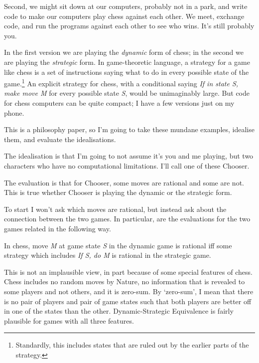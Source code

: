 \documentclass[
  11pt,
  letterpaper,
  DIV=11,
  numbers=noendperiod,
  twoside]{scrartcl}
\providecommand{\tightlist}{%
  \setlength{\itemsep}{0pt}\setlength{\parskip}{0pt}}
\begin{document}
Second, we might sit down at our computers, probably not in a park, and
write code to make our computers play chess against each other. We meet,
exchange code, and run the programs against each other to see who wins.
It's still probably you.

In the first version we are playing the \emph{dynamic} form of chess; in
the second we are playing the \emph{strategic} form. In game-theoretic
language, a strategy for a game like chess is a set of instructions
saying what to do in every possible state of the game.\footnote{Standardly,
  this includes states that are ruled out by the earlier parts of the
  strategy.} An explicit strategy for chess, with a conditional saying
\emph{If in state S, make move M} for every possible state \emph{S},
would be unimaginably large. But code for chess computers can be quite
compact; I have a few versions just on my phone.

This is a philosophy paper, so I'm going to take these mundane examples,
idealise them, and evaluate the idealisations.

The idealisation is that I'm going to not assume it's you and me
playing, but two characters who have no computational limitations. I'll
call one of these Chooser.

The evaluation is that for Chooser, some moves are rational and some are
not. This is true whether Chooser is playing the dynamic or the
strategic form.

To start I won't ask which moves are rational, but instead ask about the
connection between the two games. In particular, are the evaluations for
the two games related in the following way.

\begin{description}
\tightlist
\item[Dynamic-Strategic Equivalence (for chess)]
In chess, move \emph{M} at game state \emph{S} in the dynamic game is
rational iff some strategy which includes \emph{If S, do M} is rational
in the strategic game.
\end{description}

This is not an implausible view, in part because of some special
features of chess. Chess includes no random moves by Nature, no
information that is revealed to some players and not others, and it is
zero-sum. By `zero-sum', I mean that there is no pair of players and
pair of game states such that both players are better off in one of the
states than the other. Dynamic-Strategic Equivalence is fairly plausible
for games with all three features.
\end{document}
